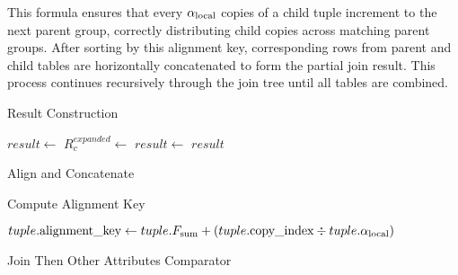 This formula ensures that every $\alpha_{\text{local}}$ copies of a child tuple increment to the next parent group, correctly distributing child copies across matching parent groups. After sorting by this alignment key, corresponding rows from parent and child tables are horizontally concatenated to form the partial join result. This process continues recursively through the join tree until all tables are combined.

\begin{algorithm}[H]
\caption{Result Construction}
\label{alg:result-construction}
\begin{algorithmic}[1]
    \State $result \leftarrow$  
            \State $R_c^{expanded} \leftarrow$  
            \State $result \leftarrow$ 
        \EndFor
    \EndFor
    \Return $result$
\EndFunction
\end{algorithmic}
\end{algorithm}

\begin{algorithm}[H]
\caption{Align and Concatenate}
\label{alg:align-concatenate}
\begin{algorithmic}[1]
    \State {} 
    \State {} 
    \State {}
    \State \Return {}
\EndFunction
\end{algorithmic}
\end{algorithm}

\begin{algorithm}[H]
\caption{Compute Alignment Key}
\label{alg:compute-alignment}
\begin{algorithmic}[1]
    \State $tuple.\text{alignment\_key} \leftarrow tuple.F_{\text{sum}} + (tuple.\text{copy\_index} \div tuple.\alpha_{\text{local}})$
\EndFunction
\end{algorithmic}
\end{algorithm}

\begin{algorithm}[H]
\caption{Join Then Other Attributes Comparator}
\label{alg:join-then-other-comparator}
\begin{algorithmic}[1]
    \Else
        \Return {}
    \EndIf
\EndFunction
\end{algorithmic}
\end{algorithm}

